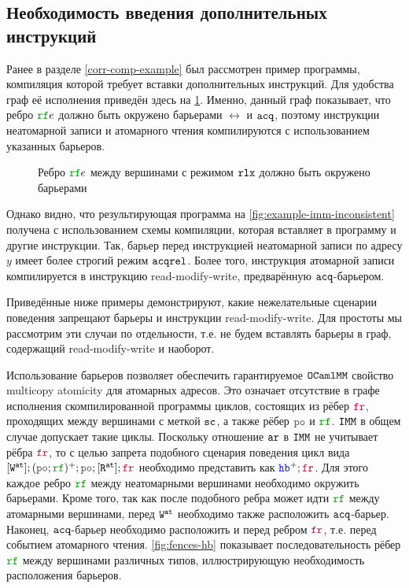 \subsection{Необходимость введения дополнительных инструкций}
\label{extra-instrs}

Ранее в разделе \ref{corr-comp-example} был рассмотрен пример программы, компиляция которой требует вставки дополнительных инструкций. Для удобства граф её исполнения приведён здесь на \cref{fig:example-imm-inconsistent-copy}. Именно, данный граф показывает, что ребро $\lRF e$ должно быть окружено барьерами $\rel$ и ${\mathtt{acq}}$, поэтому инструкции неатомарной записи и атомарного чтения компилируются с использованием указанных барьеров.


\renewcommand{\hsIV}{4}
\begin{figure}[h]
  \centering
  \begin{minipage}{0.9\textwidth}
    \centering
  \end{minipage}
  \caption{Ребро $\lRF e$ между вершинами с режимом $\mathtt{rlx}$ должно быть окружено барьерами}
  \label{fig:example-imm-inconsistent-copy}
\end{figure}


Однако видно, что результирующая программа на \cref{fig:example-imm-inconsistent} получена с использованием схемы компиляции, которая вставляет в программу и другие инструкции. Так, барьер перед инструкцией неатомарной записи по адресу $y$ имеет более строгий режим ${\mathtt{acqrel}}$. Более того, инструкция атомарной записи компилируется в инструкцию read-modify-write, предварённую ${\mathtt{acq}}$-барьером.

Приведённые ниже примеры демонстрируют, какие нежелательные сценарии поведения запрещают барьеры и инструкции read-modify-write. Для простоты мы рассмотрим эти случаи по отдельности, т.е. не будем вставлять барьеры в граф, содержащий read-modify-write и наоборот. 

Использование барьеров позволяет обеспечить гарантируемое $\mathtt{OCaml}\allowbreak \mathtt{MM}$ свойство multicopy atomicity для атомарных адресов. Это означает отсутствие в графе исполнения скомпилированной программы циклов, состоящих из рёбер $\lFR$, проходящих между вершинами с меткой ${\mathtt{sc}}$, а также рёбер $\lPO$ и $\lRF$. $\mathtt{IMM}$ в общем случае допускает такие циклы. Поскольку отношение $\lAR$ в $\mathtt{IMM}$ не учитывает рёбра $\lFR$, то с целью запрета подобного сценария поведения цикл вида $[\lW^\at];(\lPO; \lRF)^{+};\lPO;[\lR^\at];\lFR$ необходимо представить как $\lHB^{+};\lFR$. Для этого каждое ребро $\lRF$ между неатомарными вершинами необходимо окружить барьерами. Кроме того, так как после подобного ребра может идти $\lRF$ между атомарными вершинами, перед ${\mathtt{W}}^{\mathtt{at}}$ необходимо также расположить ${\mathtt{acq}}$-барьер. Наконец, ${\mathtt{acq}}$-барьер необходимо расположить и перед ребром $\lFR$, т.е. перед событием атомарного чтения. \cref{fig:fences-hb} показывает последовательность рёбер $\lRF$ между вершинами различных типов, иллюстрирующую необходимость расположения барьеров. 

